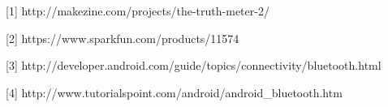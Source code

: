\documentclass[finalProposal.tex]{subfiles}
\begin{document}
\onehalfspacing


\bigskip

[1] http://makezine.com/projects/the-truth-meter-2/ 

[2] https://www.sparkfun.com/products/11574

[3] http://developer.android.com/guide/topics/connectivity/bluetooth.html

[4] http://www.tutorialspoint.com/android/android_bluetooth.htm
\end{document}
